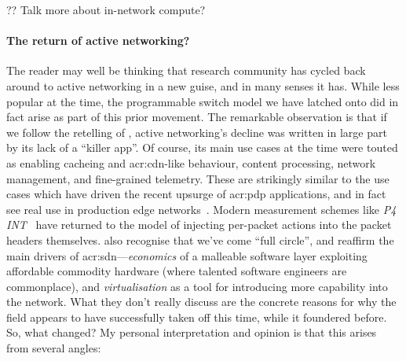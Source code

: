 ?? Talk more about in-network compute?

\paragraph{The return of active networking?}
The reader may well be thinking that research community has cycled back around to active networking in a new guise, and in many senses it has.
While less popular at the time, the programmable switch model we have latched onto did in fact arise as part of this prior movement.
The remarkable observation is that if we follow the retelling of \Textcite{DBLP:journals/ccr/FeamsterRZ14}, active networking's decline was written in large part by its lack of a ``killer app''.
Of course, its main use cases at the time were touted as enabling cacheing and \gls{acr:cdn}-like behaviour, content processing, network management, and fine-grained telemetry.
These are strikingly similar to the use cases which have driven the recent upsurge of \gls{acr:pdp} applications, and in fact see real use in production edge networks~\parencite{DBLP:conf/sigcomm/TianGLZCZDYMTLW21}.
Modern measurement schemes like \emph{P4 INT}~\parencite{p4-int} have returned to the model of injecting per-packet actions into the packet headers themselves.
\Textcite{DBLP:journals/ccr/WetherallT19} also recognise that we've come ``full circle'', and reaffirm the main drivers of \gls{acr:sdn}---\emph{economics} of a malleable software layer exploiting affordable commodity hardware (where talented software engineers are commonplace), and \emph{virtualisation} as a tool for introducing more capability into the network.
What they don't really discuss are the concrete reasons for why the field appears to have successfully taken off this time, while it foundered before.
So, what changed?
My personal interpretation and opinion is that this arises from several angles: 
